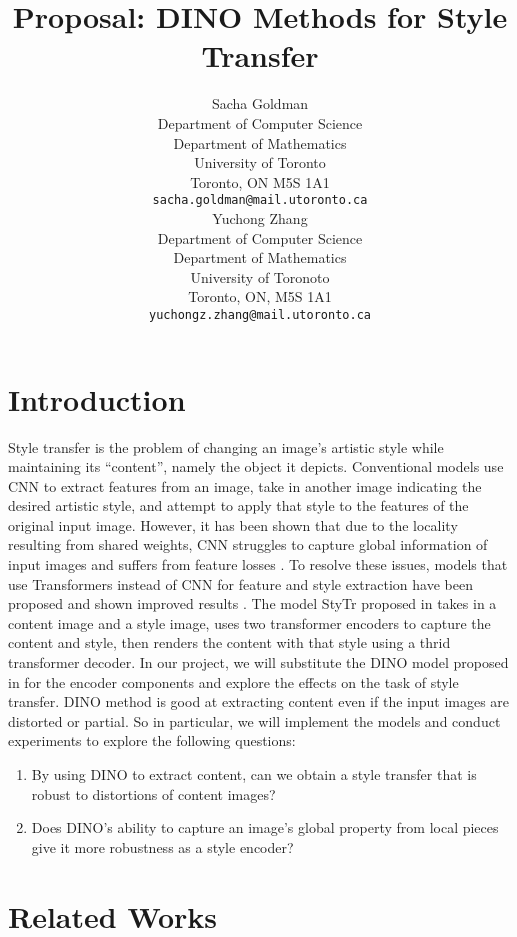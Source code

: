 \documentclass{article}
\title{Proposal: DINO Methods for Style Transfer}
\author{
  Sacha Goldman \\
  Department of Computer Science\\ 
  Department of Mathematics\\
  University of Toronto\\
  Toronto, ON M5S 1A1 \\
  \texttt{sacha.goldman@mail.utoronto.ca} \\
  \And
  Yuchong Zhang \\
  Department of Computer Science \\
  Department of Mathematics \\
  University of Toronoto \\
  Toronto, ON, M5S 1A1 \\
  \texttt{yuchongz.zhang@mail.utoronto.ca} \\
}
\begin{document}
\maketitle

\begin{abstract}

\end{abstract}

\section{Introduction}
Style transfer is the problem of changing an image's artistic style while maintaining its ``content'', namely the object it depicts. Conventional models use CNN to extract features from an image, take in another image indicating the desired artistic style, and attempt to apply that style to the features of the original input image. However, it has been shown that due to the locality resulting from shared weights, CNN struggles to capture global information of input images and suffers from feature losses \cite{ImageStyleTransformer}. To resolve these issues, models that use Transformers instead of CNN for feature and style extraction have been proposed and shown improved results \cite{ImageStyleTransformer}. The model StyTr proposed in \cite{ImageStyleTransformer} takes in a content image and a style image, uses two transformer encoders to capture the content and style, then renders the content with that style using a thrid transformer decoder. In our project, we will substitute the DINO model proposed in \cite{DINO} for the encoder components and explore the effects on the task of style transfer. DINO method is good at extracting content even if the input images are distorted or partial. So in particular, we will implement the models and conduct experiments to explore the following questions:
\begin{enumerate}
  \item By using DINO to extract content, can we obtain a style transfer that is robust to distortions of content images?
  \item Does DINO's ability to capture an image's global property from local pieces give it more robustness as a style encoder?
\end{enumerate}


\section{Related Works}
\end{document}
